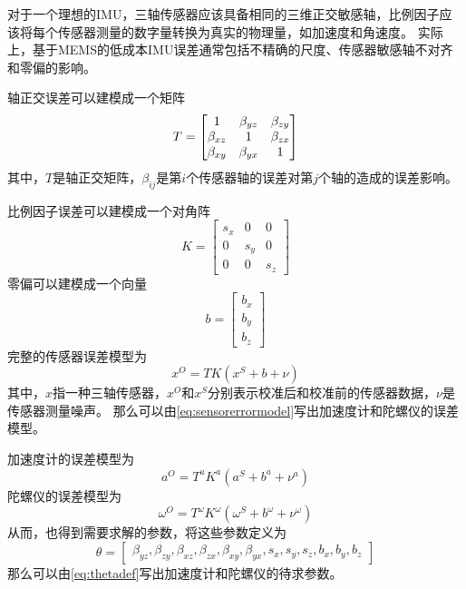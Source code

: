 \documentclass[
  type=master
]{gdutthesis}
\begin{document}
对于一个理想的IMU，三轴传感器应该具备相同的三维正交敏感轴，比例因子应该将每个传感器测量的数字量转换为真实的物理量，如加速度和角速度。
实际上，基于MEMS的低成本IMU误差通常包括不精确的尺度、传感器敏感轴不对齐和零偏的影响。

轴正交误差可以建模成一个矩阵
\begin{equation}\label{eq:axiserror}
	T=
	\begin{bmatrix}
		1 & \beta_{yz} & \beta_{zy}\\
		\beta_{xz} & 1 & \beta_{zx}\\
		\beta_{xy} & \beta_{yx} & 1
	\end{bmatrix}\vspace{1ex}
\end{equation}
其中，$T$是轴正交矩阵，$\beta_{ij}$是第$i$个传感器轴的误差对第$j$个轴的造成的误差影响。

比例因子误差可以建模成一个对角阵
\begin{equation}\label{eq:scaleerror}
	K=
	\begin{bmatrix}
		s_x & 0 & 0\\
		0 & s_y & 0\\
		0 & 0 & s_z
	\end{bmatrix}
\end{equation}
零偏可以建模成一个向量
\begin{equation}\label{eq:scaleerror}
	b=
	\begin{bmatrix}
		b_x\\
		b_y\\
		b_z
	\end{bmatrix}
\end{equation}
完整的传感器误差模型为
\begin{equation}\label{eq:sensorerrormodel}
	x^O=T K (x^S + b + \nu)
\end{equation}
其中，$x$指一种三轴传感器，$x^O$和$x^S$分别表示校准后和校准前的传感器数据，$ν$是传感器测量噪声。
那么可以由\autoref{eq:sensorerrormodel}写出加速度计和陀螺仪的误差模型。

加速度计的误差模型为
\begin{equation}
	a^O=T^a K^a (a^S + b^a + \nu^a)
\end{equation}
陀螺仪的误差模型为
\begin{equation}\label{eq:accerrormodel}
	\omega^O=T^\omega K^\omega (\omega^S + b^\omega + \nu^\omega)
\end{equation}
从而，也得到需要求解的参数，将这些参数定义为
\begin{equation}\label{eq:thetadef}
	\theta = 
	\begin{bmatrix}
		\beta_{yz},\beta_{zy},\beta_{xz},\beta_{zx},\beta_{xy}, \beta_{yx},s_x,s_y,s_z,b_x,b_y,b_z
	\end{bmatrix}
\end{equation}
那么可以由\autoref{eq:thetadef}写出加速度计和陀螺仪的待求参数。
\end{document}
